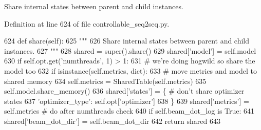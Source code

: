 \begin{DoxyVerb}Share internal states between parent and child instances.
\end{DoxyVerb}
 

Definition at line 624 of file controllable\+\_\+seq2seq.\+py.


\begin{DoxyCode}
624     \textcolor{keyword}{def }share(self):
625         \textcolor{stringliteral}{"""}
626 \textcolor{stringliteral}{        Share internal states between parent and child instances.}
627 \textcolor{stringliteral}{        """}
628         shared = super().share()
629         shared[\textcolor{stringliteral}{'model'}] = self.model
630         \textcolor{keywordflow}{if} self.opt.get(\textcolor{stringliteral}{'numthreads'}, 1) > 1:
631             \textcolor{comment}{# we're doing hogwild so share the model too}
632             \textcolor{keywordflow}{if} isinstance(self.metrics, dict):
633                 \textcolor{comment}{# move metrics and model to shared memory}
634                 self.metrics = SharedTable(self.metrics)
635                 self.model.share\_memory()
636             shared[\textcolor{stringliteral}{'states'}] = \{  \textcolor{comment}{# don't share optimizer states}
637                 \textcolor{stringliteral}{'optimizer\_type'}: self.opt[\textcolor{stringliteral}{'optimizer'}]
638             \}
639         shared[\textcolor{stringliteral}{'metrics'}] = self.metrics  \textcolor{comment}{# do after numthreads check}
640         \textcolor{keywordflow}{if} self.beam\_dot\_log \textcolor{keywordflow}{is} \textcolor{keyword}{True}:
641             shared[\textcolor{stringliteral}{'beam\_dot\_dir'}] = self.beam\_dot\_dir
642         \textcolor{keywordflow}{return} shared
643 
\end{DoxyCode}
\mbox{\label{classprojects_1_1controllable__dialogue_1_1controllable__seq2seq_1_1controllable__seq2seq_1_1ControllableSeq2seqAgent_a656ea2270ec3d407d67782754ead5f87}} 
